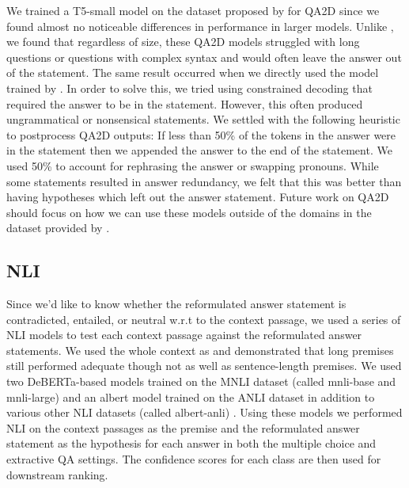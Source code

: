 \documentclass[11pt]{article}
\begin{document}
We trained a T5-small model \citep{raffel_exploring_2020} on the dataset proposed by \citet{demszky_transforming_2018} for QA2D since we found almost no noticeable differences in performance in larger models. Unlike \citet{chen_can_2021}, we found that regardless of size, these QA2D models struggled with long questions or questions with complex syntax and would often leave the answer out of the statement. The same result occurred when we directly used the model trained by \citet{chen_can_2021}. In order to solve this, we tried using constrained decoding that required the answer to be in the statement. However, this often produced ungrammatical or nonsensical statements. We settled with the following heuristic to postprocess QA2D outputs: If less than 50\% of the tokens in the answer were in the statement then we appended the answer to the end of the statement. We used 50\% to account for rephrasing the answer or swapping pronouns. While some statements resulted in answer redundancy, we felt that this was better than having hypotheses which left out the answer statement. Future work on QA2D should focus on how we can use these models outside of the domains in the dataset provided by \citet{demszky_transforming_2018}.
\subsection{NLI}
Since we’d like to know whether the reformulated answer statement is contradicted, entailed, or neutral w.r.t to the context passage, we used a series of NLI models to test each context passage against the reformulated answer statements. We used the whole context as \citet{schuster_stretching_2022} and \citet{mishra_looking_2021} demonstrated that long premises still performed adequate though not as well as sentence-length premises.
We used two DeBERTa-based models \citep{he_deberta_2021} trained on the MNLI dataset (called mnli-base and mnli-large) and an albert model trained on the ANLI dataset in addition to various other NLI datasets (called albert-anli) \citep{nie_adversarial_2020}. Using these models we performed NLI on the context passages as the premise and the reformulated answer statement as the hypothesis for each answer in both the multiple choice and extractive QA settings. The confidence scores for each class are then used for downstream ranking.
\end{document}
